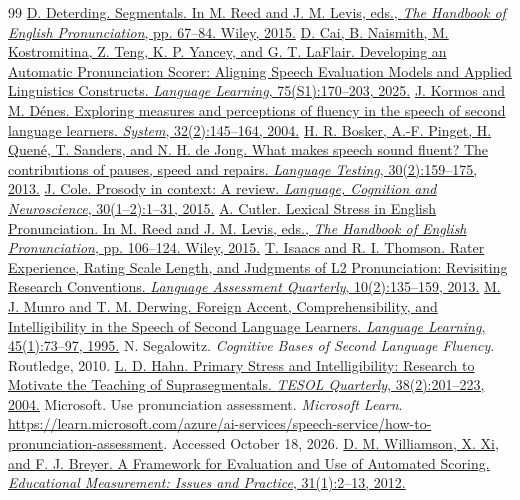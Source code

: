 \documentclass[10pt]{article}
\begin{document}
\begin{thebibliography}{99}
 \href{https://doi.org/10.1002/9781118346952.ch4}{D. Deterding. Segmentals. In M. Reed and J. M. Levis, eds., \textit{The Handbook of English Pronunciation}, pp. 67--84. Wiley, 2015.}
 \href{https://doi.org/10.1111/lang.70000}{D. Cai, B. Naismith, M. Kostromitina, Z. Teng, K. P. Yancey, and G. T. LaFlair. Developing an Automatic Pronunciation Scorer: Aligning Speech Evaluation Models and Applied Linguistics Constructs. \textit{Language Learning}, 75(S1):170--203, 2025.}
 \href{https://doi.org/10.1016/j.system.2004.01.001}{J. Kormos and M. D\'enes. Exploring measures and perceptions of fluency in the speech of second language learners. \textit{System}, 32(2):145--164, 2004.}
 \href{https://doi.org/10.1177/0265532212455394}{H. R. Bosker, A.-F. Pinget, H. Quen\'e, T. Sanders, and N. H. de Jong. What makes speech sound fluent? The contributions of pauses, speed and repairs. \textit{Language Testing}, 30(2):159--175, 2013.}
 \href{https://doi.org/10.1080/23273798.2014.963130}{J. Cole. Prosody in context: A review. \textit{Language, Cognition and Neuroscience}, 30(1--2):1--31, 2015.}
 \href{https://doi.org/10.1002/9781118346952.ch6}{A. Cutler. Lexical Stress in English Pronunciation. In M. Reed and J. M. Levis, eds., \textit{The Handbook of English Pronunciation}, pp. 106--124. Wiley, 2015.}
 \href{https://doi.org/10.1080/15434303.2013.769545}{T. Isaacs and R. I. Thomson. Rater Experience, Rating Scale Length, and Judgments of L2 Pronunciation: Revisiting Research Conventions. \textit{Language Assessment Quarterly}, 10(2):135--159, 2013.}
 \href{https://doi.org/10.1111/j.1467-1770.1995.tb00963.x}{M. J. Munro and T. M. Derwing. Foreign Accent, Comprehensibility, and Intelligibility in the Speech of Second Language Learners. \textit{Language Learning}, 45(1):73--97, 1995.}
 N. Segalowitz. \textit{Cognitive Bases of Second Language Fluency}. Routledge, 2010.
 \href{https://doi.org/10.2307/3588378}{L. D. Hahn. Primary Stress and Intelligibility: Research to Motivate the Teaching of Suprasegmentals. \textit{TESOL Quarterly}, 38(2):201--223, 2004.}
 Microsoft. Use pronunciation assessment. \textit{Microsoft Learn}. \url{https://learn.microsoft.com/azure/ai-services/speech-service/how-to-pronunciation-assessment}. Accessed October 18, 2026.
 \href{https://doi.org/10.1111/j.1745-3992.2011.00223.x}{D. M. Williamson, X. Xi, and F. J. Breyer. A Framework for Evaluation and Use of Automated Scoring. \textit{Educational Measurement: Issues and Practice}, 31(1):2--13, 2012.}

\end{thebibliography}
\end{document}

